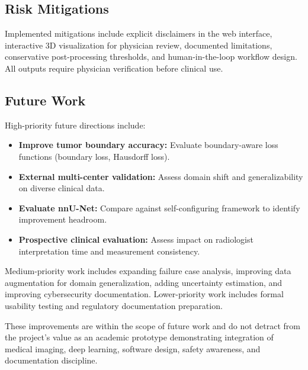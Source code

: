 \subsection{Risk Mitigations}

Implemented mitigations include explicit disclaimers in the web interface, interactive 3D visualization for physician review, documented limitations, conservative post-processing thresholds, and human-in-the-loop workflow design. All outputs require physician verification before clinical use.

\subsection{Future Work}

High-priority future directions include:
\begin{itemize}
    \item \textbf{Improve tumor boundary accuracy:} Evaluate boundary-aware loss functions (boundary loss, Hausdorff loss).
    \item \textbf{External multi-center validation:} Assess domain shift and generalizability on diverse clinical data.
    \item \textbf{Evaluate nnU-Net:} Compare against self-configuring framework to identify improvement headroom.
    \item \textbf{Prospective clinical evaluation:} Assess impact on radiologist interpretation time and measurement consistency.
\end{itemize}

Medium-priority work includes expanding failure case analysis, improving data augmentation for domain generalization, adding uncertainty estimation, and improving cybersecurity documentation. Lower-priority work includes formal usability testing and regulatory documentation preparation.

These improvements are within the scope of future work and do not detract from the project's value as an academic prototype demonstrating integration of medical imaging, deep learning, software design, safety awareness, and documentation discipline.
